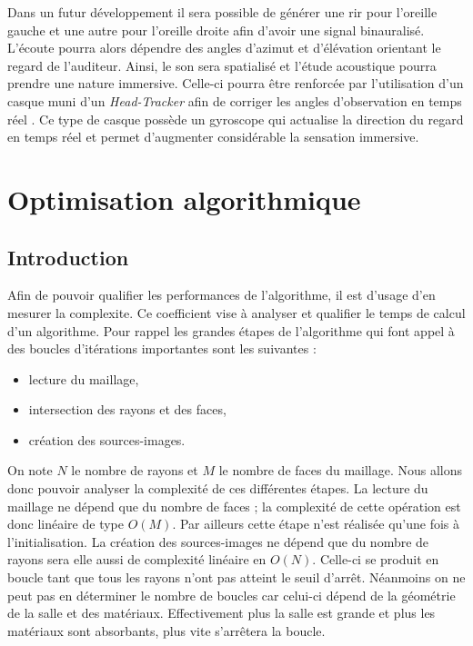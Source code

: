 Dans un futur développement il sera possible de générer une \gls{rir} pour l'oreille gauche et une autre pour l'oreille droite afin d'avoir une signal binauralisé. L'écoute pourra alors dépendre des angles d'azimut et d'élévation orientant le regard de l'auditeur. Ainsi, le son sera spatialisé et l'étude acoustique pourra prendre une nature immersive. Celle-ci pourra être renforcée par l'utilisation d'un casque muni d'un \textit{Head-Tracker} afin de corriger les angles d'observation en temps réel \cite{myBino}. Ce type de casque possède un gyroscope qui actualise la direction du regard en temps réel et permet d'augmenter considérable la sensation immersive. 

%






\chapter{Optimisation algorithmique}
	\minitoc
	\newpage
	
\section*{Introduction} \label{sect_complexite}

Afin de pouvoir qualifier les performances de l'algorithme, il est d'usage d'en mesurer la \gls{complexite}. Ce coefficient vise à analyser et qualifier le temps de calcul d'un algorithme. Pour rappel les grandes étapes de l'algorithme qui font appel à des boucles d'itérations importantes sont les suivantes :
\begin{itemize}
\item lecture du maillage,
\item intersection des rayons et des faces,
\item création des sources-images.
\end{itemize}
On note $N$ le nombre de rayons et $M$ le nombre de faces du maillage. Nous allons donc pouvoir analyser la complexité de ces différentes étapes. La lecture du maillage ne dépend que du nombre de faces ; la complexité de cette opération est donc linéaire de type $O(M)$. Par ailleurs cette étape n'est réalisée qu'une fois à l'initialisation. La création des sources-images ne dépend que du nombre de rayons sera elle aussi de complexité linéaire en $O(N)$. Celle-ci se produit en boucle tant que tous les rayons n'ont pas atteint le seuil d'arrêt. Néanmoins on ne peut pas en déterminer le nombre de boucles car celui-ci dépend de la géométrie de la salle et des matériaux. Effectivement plus la salle est grande et plus les matériaux sont absorbants, plus vite s'arrêtera la boucle. 

